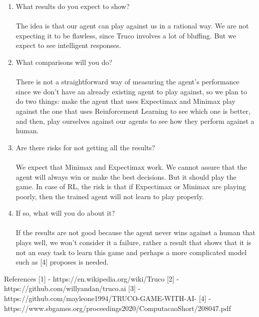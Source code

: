\documentclass{article}
\begin{document}
\begin{enumerate}
\item What results do you expect to show?
\\\\
The idea is that our agent can play against us in a rational way. We are not expecting it to be flawless, since Truco involves a lot of bluffing. But we expect to see intelligent responses.                                                                                                                        

\item What comparisons will you do?
\\\\
There is not a straightforward way of measuring the agent’s performance since we don’t have an already existing agent to play against, so we plan to do two things: make the agent that uses Expectimax and Minimax play against the one that uses Reinforcement Learning to see which one is better, and then, play ourselves against our agents to see how they perform against a human.
\item Are there risks for not getting all the results?
\\\\ 
We expect that Minimax and Expectimax work. We cannot assure that the agent will always win or make the best decisions. But it should play the game. In case of RL, the risk is that if Expectimax or Minimax are playing poorly, then the trained agent will not learn to play properly.    
    
\item If so, what will you do about it?
\\\\	
If the results are not good because the agent never wins against a human that plays well, we won’t consider it a failure, rather a result that shows that it is not an easy task to learn this game and perhaps a more complicated model such as [4] proposes is needed.

\end{enumerate}


References
[1] -  https://en.wikipedia.org/wiki/Truco
[2] - https://github.com/willyandan/truco.ai
[3] - https://github.com/mayleone1994/TRUCO-GAME-WITH-AI-
[4] - https://www.sbgames.org/proceedings2020/ComputacaoShort/208047.pdf        
\end{document}
